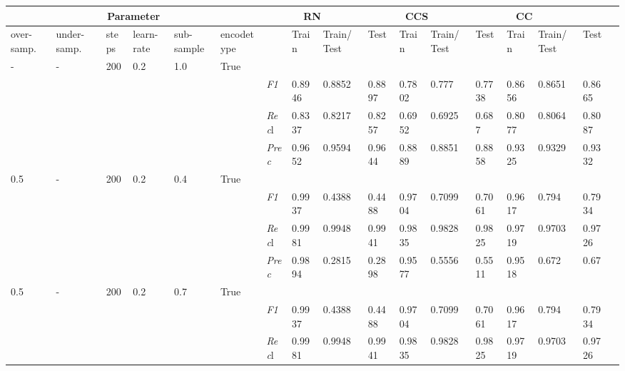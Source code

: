     \begin{table}[]
    \tiny
    \tabcolsep=0.11cm
    \begin{tabularx}{\textwidth}{XXXXXX|X|XXX|XXX|XXXX}
    \toprule
    \multicolumn{6}{c}{Parameter} & \multicolumn{3}{c}{RN} & \multicolumn{3}{c}{CCS} & \multicolumn{3}{c}{CC} \\ \midrule
    over-\newline samp. & under-\newline samp. & steps &learn-\newline rate & sub-\newline sample & encode\newline type & & Train & Train/\newline Test & Test & Train & Train/\newline Test & Test & Train & Train/\newline Test & Test \\ \midrule
    - & - & 200 & 0.2 & 1.0 &True & & & & & & & & & \\
    & & & & & & \textit{F1} & 0.8946 & 0.8852 & 0.8897 & 0.7802 & 0.777        & 0.7738        & 0.8656        & 0.8651        & 0.8665        \\
    & & & & & & \textit{Rec}l & 0.8337 & 0.8217 & 0.8257    & 0.6952 & 0.6925    & 0.687    & 0.8077    & 0.8064    & 0.8087    \\
    & & & & & & \textit{Prec} & 0.9652 & 0.9594 & 0.9644 & 0.8889 & 0.8851 & 0.8858 & 0.9325 & 0.9329 & 0.9332 \\ \midrule
    0.5 & - & 200 & 0.2 & 0.4 &True & & & & & & & & & \\
    & & & & & & \textit{F1} & 0.9937 & 0.4388 & 0.4488 & 0.9704 & 0.7099        & 0.7061        & 0.9617        & 0.794        & 0.7934        \\
    & & & & & & \textit{Rec}l & 0.9981 & 0.9948 & 0.9941    & 0.9835 & 0.9828    & 0.9825    & 0.9719    & 0.9703    & 0.9726    \\
    & & & & & & \textit{Prec} & 0.9894 & 0.2815 & 0.2898 & 0.9577 & 0.5556 & 0.5511 & 0.9518 & 0.672 & 0.67 \\ \midrule
    0.5 & - & 200 & 0.2 & 0.7 &True & & & & & & & & & \\
    & & & & & & \textit{F1} & 0.9937 & 0.4388 & 0.4488 & 0.9704 & 0.7099        & 0.7061        & 0.9617        & 0.794        & 0.7934        \\
    & & & & & & \textit{Rec}l & 0.9981 & 0.9948 & 0.9941    & 0.9835 & 0.9828    & 0.9825    & 0.9719    & 0.9703    & 0.9726    \\

\end{tabularx}
\end{table}
